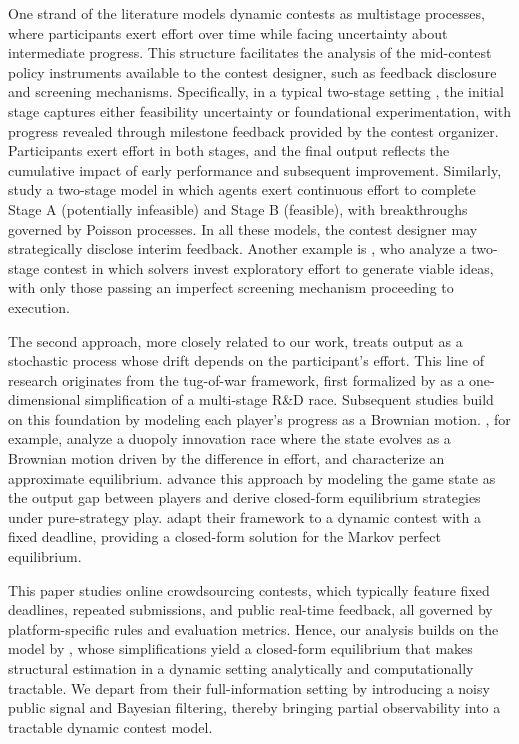 \documentclass[mnsc]{informs3}
\begin{document}
One strand of the literature models dynamic contests as multistage processes, where participants exert effort over time while facing uncertainty about intermediate progress.
This structure facilitates the analysis of the mid-contest policy instruments available to the contest designer, such as feedback disclosure and screening mechanisms.
Specifically, in a typical two-stage setting \citep{aoyagi2010information, mihm2019feedback}, the initial stage captures either feasibility uncertainty or foundational experimentation, with progress revealed through milestone feedback provided by the contest organizer.
Participants exert effort in both stages, and the final output reflects the cumulative impact of early performance and subsequent improvement.
Similarly, \citet{bimpikis2019designing} study a two-stage model in which agents exert continuous effort to complete Stage A (potentially infeasible) and Stage B (feasible), with breakthroughs governed by Poisson processes.
In all these models, the contest designer may strategically disclose interim feedback.
Another example is \citet{Khorasani2023screening}, who analyze a two-stage contest in which solvers invest exploratory effort to generate viable ideas, with only those passing an imperfect screening mechanism proceeding to execution.

The second approach, more closely related to our work, treats output as a stochastic process whose drift depends on the participant’s effort.
This line of research originates from the tug-of-war framework, first formalized by \citet{Harris1987Race} as a one-dimensional simplification of a multi-stage R\&D race.
Subsequent studies build on this foundation by modeling each player’s progress as a Brownian motion.
\citet{budd1993Duopoly}, for example, analyze a duopoly innovation race where the state evolves as a Brownian motion driven by the difference in effort, and characterize an approximate equilibrium.
\citet{Moscarini2007Contest} advance this approach by modeling the game state as the output gap between players and derive closed-form equilibrium strategies under pure-strategy play.
\citet{Ryvkin2022Fight} adapt their framework to a dynamic contest with a fixed deadline, providing a closed-form solution for the Markov perfect equilibrium.


This paper studies online crowdsourcing contests, which typically feature fixed deadlines, repeated submissions, and public real-time feedback, all governed by platform-specific rules and evaluation metrics.
Hence, our analysis builds on the model by \citet{Ryvkin2022Fight}, whose simplifications yield a closed-form equilibrium that makes structural estimation in a dynamic setting analytically and computationally tractable.
We depart from their full-information setting by introducing a noisy public signal and Bayesian filtering, thereby bringing partial observability into a tractable dynamic contest model.
\end{document}
